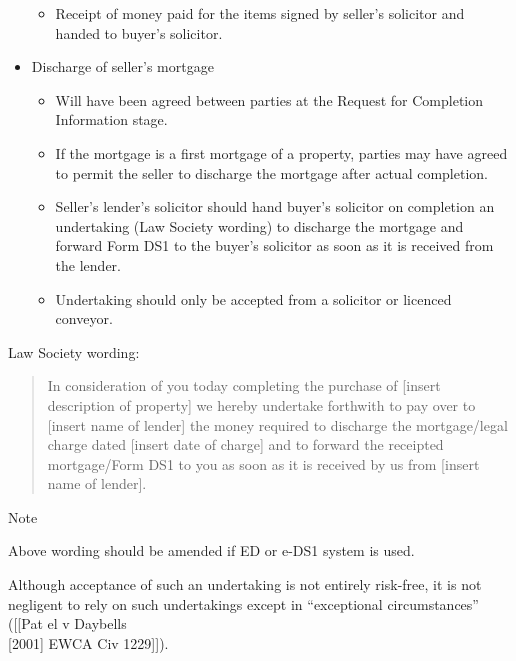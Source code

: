 \documentclass[
]{article}
\providecommand{\tightlist}{%
  \setlength{\itemsep}{0pt}\setlength{\parskip}{0pt}}
\newenvironment{env-26e46416-ae85-483b-902c-8b907b2dceb8}
{
    \savenotes\tcolorbox[blanker,breakable,left=5pt,borderline west={2pt}{-4pt}{blue}]
}
{
    \endtcolorbox\spewnotes
}
\begin{document}
\begin{itemize}
  \begin{itemize}
  \tightlist
  \item
    Receipt of money paid for the items signed by seller's solicitor and
    handed to buyer's solicitor.
  \end{itemize}
\item
  Discharge of seller's mortgage

  \begin{itemize}
  \tightlist
  \item
    Will have been agreed between parties at the Request for Completion
    Information stage.
  \item
    If the mortgage is a first mortgage of a property, parties may have
    agreed to permit the seller to discharge the mortgage after actual
    completion.
  \item
    Seller's lender's solicitor should hand buyer's solicitor on
    completion an undertaking (Law Society wording) to discharge the
    mortgage and forward Form DS1 to the buyer's solicitor as soon as it
    is received from the lender.
  \item
    Undertaking should only be accepted from a solicitor or licenced
    conveyor.
  \end{itemize}
\end{itemize}

Law Society wording:

\begin{quote}
In consideration of you today completing the purchase of {[}insert
description of property{]} we hereby undertake forthwith to pay over to
{[}insert name of lender{]} the money required to discharge the
mortgage/legal charge dated {[}insert date of charge{]} and to forward
the receipted mortgage/Form DS1 to you as soon as it is received by us
from {[}insert name of lender{]}.
\end{quote}

\begin{env-26e46416-ae85-483b-902c-8b907b2dceb8}

Note

Above wording should be amended if ED or e-DS1 system is used.

\end{env-26e46416-ae85-483b-902c-8b907b2dceb8}

Although acceptance of such an undertaking is not entirely risk-free, it
is not negligent to rely on such undertakings except in ``exceptional
circumstances'' ({[}{[}Pat el v Daybells\\
{[}2001{]} EWCA Civ 1229{]}{]}).
\end{document}
